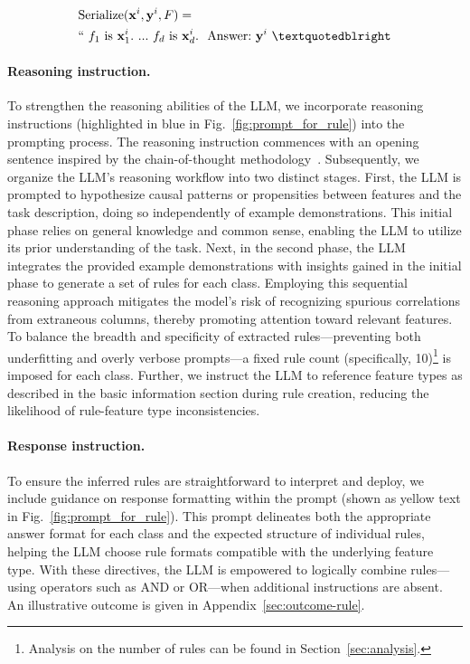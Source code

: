 \begin{align}
&\text{Serialize}(\mathbf{x}^i,\mathbf{y}^i, F) = \nonumber \\ 
&``\ f_1\ \text{is}\ \mathbf{x}^i_1.\ ... \ f_d\  \text{is}\  \mathbf{x}^i_d.\ \ \text{Answer:}\  \mathbf{y}^i\ ”
\end{align}

\vspace*{-0.12in}
\paragraph{Reasoning instruction.} To strengthen the reasoning abilities of the LLM, we incorporate reasoning instructions (highlighted in blue in Fig.~\ref{fig:prompt_for_rule}) into the prompting process. The reasoning instruction commences with an opening sentence inspired by the chain-of-thought methodology~\cite{wei2022chain}. Subsequently, we organize the LLM's reasoning workflow into two distinct stages. First, the LLM is prompted to hypothesize causal patterns or propensities between features and the task description, doing so independently of example demonstrations. This initial phase relies on general knowledge and common sense, enabling the LLM to utilize its prior understanding of the task. Next, in the second phase, the LLM integrates the provided example demonstrations with insights gained in the initial phase to generate a set of rules for each class. Employing this sequential reasoning approach mitigates the model's risk of recognizing spurious correlations from extraneous columns, thereby promoting attention toward relevant features. To balance the breadth and specificity of extracted rules—preventing both underfitting and overly verbose prompts—a fixed rule count (specifically, 10)\footnote{Analysis on the number of rules can be found in Section~\ref{sec:analysis}.} is imposed for each class. Further, we instruct the LLM to reference feature types as described in the basic information section during rule creation, reducing the likelihood of rule-feature type inconsistencies.

\vspace*{-0.12in}
\paragraph{Response instruction.} To ensure the inferred rules are straightforward to interpret and deploy, we include guidance on response formatting within the prompt (shown as yellow text in Fig.~\ref{fig:prompt_for_rule}). This prompt delineates both the appropriate answer format for each class and the expected structure of individual rules, helping the LLM choose rule formats compatible with the underlying feature type. With these directives, the LLM is empowered to logically combine rules—using operators such as AND or OR—when additional instructions are absent. An illustrative outcome is given in Appendix~\ref{sec:outcome-rule}.

